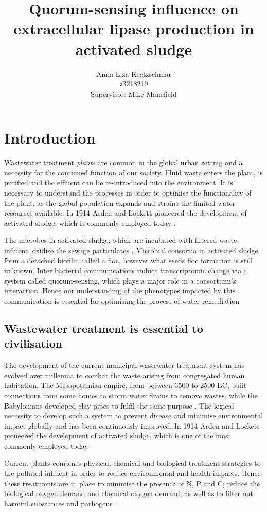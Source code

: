 \documentclass[11pt]{article}
\title{\textbf{Quorum-sensing influence on extracellular lipase production in activated sludge}}
\author{Anna Liza Kretzschmar\\
        z3218219\\
        Supervisor: Mike Manefield}
\date{}
\begin{document}
\maketitle

\section{Introduction}
Wastewater treatment \emph{plants} are common in the global urban setting and a necessity for the continued function of our society. Fluid waste enters the plant, is purified and the effluent can be re-introduced into the environment. It is necessary to understand the processes in order to optimise the functionality of the plant, as the global population expands and strains the limited water resources available. In 1914 Arden and Lockett pioneered the development of activated sludge, which is commonly employed today \cite{ardern1914experiments}.


The microbes in activated sludge, which are incubated with filtered waste influent, oxidise the sewage particulates \cite{Price_95}. Microbial consortia in activated sludge form a detached biofilm called a floc, however what seeds floc formation is still unknown. Inter bacterial communications induce transcriptomic change via a system called quorum-sensing, which plays a major role in a consortium's interaction\cite{parsek2005sociomicrobiology}. Hence our understanding of the phenotypes impacted by this communication is essential for optimising the process of water remediation \cite{singh2006biofilms}

\subsection{Wastewater treatment is essential to civilisation}
The development of the current municipal wastewater treatment system has evolved over millennia to combat the waste arising from congregated human habitation. The Mesopotamian empire, from between 3500 to 2500 BC, built connections from some homes to storm water drains to remove wastes, while the Babylonians developed clay pipes to fulfil the same purpose \cite{lofrano2010}. The logical necessity to develop such a system to prevent disease and minimise environmental impact globally and has been continuously improved. In 1914 Arden and Lockett pioneered the development of activated sludge, which is one of the most commonly employed today \cite{jenkins2004manual,muchie2010bioremediation}


Current plants combines physical, chemical and biological treatment strategies to the polluted influent in order to reduce environmental and health impacts. Hence these treatments are in place to minimise the presence of N, P and C; reduce the biological oxygen demand and chemical oxygen demand; as well as to filter out harmful substances and pathogens \cite{mayhew1997low}.
\end{document}
